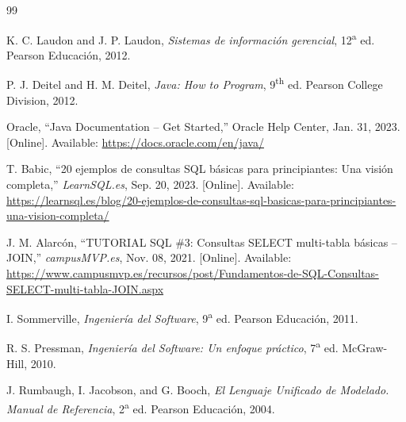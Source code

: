 \documentclass[12pt,a4paper]{report}
\begin{document}
\begin{thebibliography}{99}

K. C. Laudon and J. P. Laudon, \textit{Sistemas de información gerencial}, 12\textsuperscript{a} ed. Pearson Educación, 2012.

P. J. Deitel and H. M. Deitel, \textit{Java: How to Program}, 9\textsuperscript{th} ed. Pearson College Division, 2012.

Oracle, ``Java Documentation -- Get Started,'' Oracle Help Center, Jan. 31, 2023. [Online]. Available: \url{https://docs.oracle.com/en/java/}

T. Babic, ``20 ejemplos de consultas SQL básicas para principiantes: Una visión completa,'' \textit{LearnSQL.es}, Sep. 20, 2023. [Online]. Available: \url{https://learnsql.es/blog/20-ejemplos-de-consultas-sql-basicas-para-principiantes-una-vision-completa/}

J. M. Alarcón, ``TUTORIAL SQL \#3: Consultas SELECT multi-tabla básicas -- JOIN,'' \textit{campusMVP.es}, Nov. 08, 2021. [Online]. Available: \url{https://www.campusmvp.es/recursos/post/Fundamentos-de-SQL-Consultas-SELECT-multi-tabla-JOIN.aspx}

I. Sommerville, \textit{Ingeniería del Software}, 9\textsuperscript{a} ed. Pearson Educación, 2011.

R. S. Pressman, \textit{Ingeniería del Software: Un enfoque práctico}, 7\textsuperscript{a} ed. McGraw-Hill, 2010.

J. Rumbaugh, I. Jacobson, and G. Booch, \textit{El Lenguaje Unificado de Modelado. Manual de Referencia}, 2\textsuperscript{a} ed. Pearson Educación, 2004.

\end{thebibliography}

\end{document}
